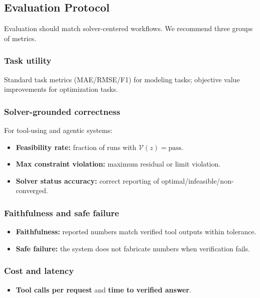 \documentclass[journal,onecolumn]{IEEEtran} %
\begin{document}
\subsection{Evaluation Protocol}
\label{sec:evaluation}

Evaluation should match solver-centered workflows. We recommend three groups of metrics.

\subsubsection{Task utility}
Standard task metrics (MAE/RMSE/F1) for modeling tasks; objective value improvements for optimization tasks.

\subsubsection{Solver-grounded correctness}
For tool-using and agentic systems:
\begin{itemize}
\item \textbf{Feasibility rate:} fraction of runs with $\mathcal{V}(z)=\text{pass}$.
\item \textbf{Max constraint violation:} maximum residual or limit violation.
\item \textbf{Solver status accuracy:} correct reporting of optimal/infeasible/non-converged.
\end{itemize}

\subsubsection{Faithfulness and safe failure}
\begin{itemize}
\item \textbf{Faithfulness:} reported numbers match verified tool outputs within tolerance.
\item \textbf{Safe failure:} the system does not fabricate numbers when verification fails.
\end{itemize}

\subsubsection{Cost and latency}
\begin{itemize}
\item \textbf{Tool calls per request} and \textbf{time to verified answer}.
\end{itemize}
\end{document}
